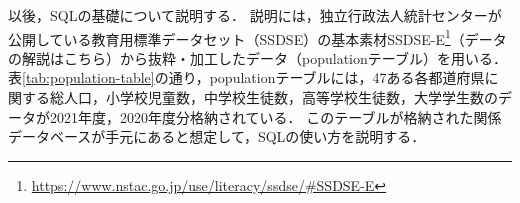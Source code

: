 以後，SQLの基礎について説明する．
説明には，独立行政法人統計センターが公開している教育用標準データセット（SSDSE）の基本素材SSDSE-E\footnote{\url{https://www.nstac.go.jp/use/literacy/ssdse/\#SSDSE-E}}（データの解説はこちら）から抜粋・加工したデータ（populationテーブル）を用いる．
表\ref{tab:population-table}の通り，populationテーブルには，47ある各都道府県に関する総人口，小学校児童数，中学校生徒数，高等学校生徒数，大学学生数のデータが2021年度，2020年度分格納されている．
このテーブルが格納された関係データベースが手元にあると想定して，SQLの使い方を説明する．
\begin{table}[tb]
    \centering
    \caption{SSDSE-Eから抜粋・加工したデータ: populationテーブル}
\end{table}
